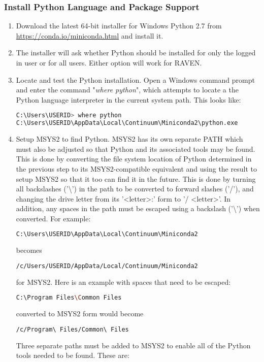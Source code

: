 \subsubsection{Install Python Language and Package Support}
\begin{enumerate}
	\item Download the latest 64-bit installer for Windows Python 2.7 from 
		\url{https://conda.io/miniconda.html} and install it.  \item The installer 
		will ask whether Python should be installed for only the logged in user or
		for all users.  Either option will work for RAVEN.
	\item Locate and test the Python installation.   Open a Windows command prompt and enter the 
		command "{\it where python}", which attempts to locate a the Python language interpreter 
		in the current system path.  This looks like:

\begin{lstlisting}[language=bash, basicstyle=\small]
C:\Users\USERID> where python
C:\Users\USERID\AppData\Local\Continuum\Miniconda2\python.exe
\end{lstlisting}

	\item Setup MSYS2 to find Python.  MSYS2 has its own separate PATH which must also be adjusted 
		so that Python and its associated tools may be found. This is done by converting the 
		file system location of Python determined in the previous step to its MSYS2-compatible 
		equivalent and using the result to setup MSYS2 so that it too can find it in the future.
		\newline \newline
		This is done by turning all backslashes ('\textbackslash') in the path to be converted to 
		forward slashes ('/'), and changing the drive letter from its '\textless letter\textgreater:' 
		form to '/ \textless letter\textgreater'. In addition, any spaces in the path must 
		be escaped using a backslash ('\textbackslash') when converted.
		\newline \newline
		For example:

\begin{lstlisting}[language=bash]
C:\Users\USERID\AppData\Local\Continuum\Miniconda2
\end{lstlisting}
		becomes
\begin{lstlisting}[language=bash]
/c/Users/USERID/AppData/Local/Continuum/Miniconda2
\end{lstlisting}
		for MSYS2. Here is an example with spaces that need to be escaped:
\begin{lstlisting}[language=bash]
C:\Program Files\Common Files
\end{lstlisting}
		converted to MSYS2 form would become
\begin{lstlisting}[language=bash]
/c/Program\ Files/Common\ Files
\end{lstlisting}
		\medskip
		Three separate paths must be added to MSYS2 to enable all of the Python tools needed 
		to be found.  These are:


\end{enumerate}
